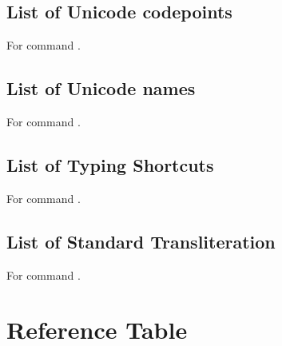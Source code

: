 \subsection{List of Unicode codepoints}
For command \codedetok{\ugtransuc{}}.
\begin{multicols}{4}\noindent
\ugtag
\ugshowplainlistuc
\eolist
\end{multicols}

\subsection{List of Unicode names}
For command \codedetok{\ugtransun{}}.
\begin{multicols}{4}\noindent
\ugtag
\ugshowplainlistun
\eolist
\end{multicols}

\subsection{List of Typing Shortcuts}
For command \codedetok{\ugtransts{}}.
\begin{multicols}{4}\noindent
\ugtag
\ugshowplainlistts
\eolist
\end{multicols}

\subsection{List of Standard Transliteration}
For command \codedetok{\ugtransst{}}.
\begin{multicols}{4}\noindent
\ugtag
\ugshowplainlistst
\eolist
\end{multicols}



\section{Reference Table}

